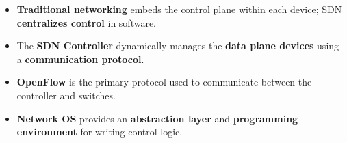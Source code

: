 \highspace
\begin{takeawaysbox}
    \begin{itemize}
        \item \textbf{Traditional networking} embeds the control plane within each device; SDN \textbf{centralizes control} in software.
        \item The \textbf{SDN Controller} dynamically manages the \textbf{data plane devices} using a \textbf{communication protocol}.
        \item \textbf{OpenFlow} is the primary protocol used to communicate between the controller and switches.
        \item \textbf{Network OS} provides an \textbf{abstraction layer} and \textbf{programming environment} for writing control logic.
    \end{itemize}
\end{takeawaysbox}

